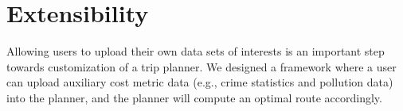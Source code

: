 \documentclass[letterpaper]{article}
\begin{document}


\section{Extensibility}
Allowing users to upload their own data sets of interests is an important
step towards customization of a trip planner.
We designed a framework where a user can upload auxiliary cost 
metric data (e.g., crime
statistics and pollution data) into the planner,
and the planner will compute an optimal route accordingly.
\end{document}
